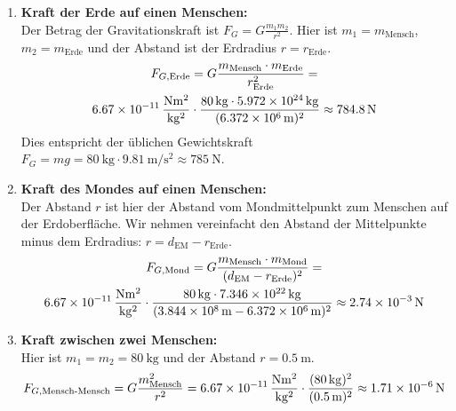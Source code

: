 \documentclass[ngerman]{scrreprt}
\newenvironment{loesungbox}[1]
  {\needspace{5\baselineskip}\begin{loesungboxstyle}[frametitle={#1}]}
  {\end{loesungboxstyle}}
\begin{document}
\begin{loesungbox}{Lösung zu \Cref{aufg:gravitation}}
\begin{enumerate}
    \item \textbf{Kraft der Erde auf einen Menschen:} \\
    Der Betrag der Gravitationskraft ist $F_G = G \frac{m_1 m_2}{r^2}$. Hier ist $m_1 = m_{\text{Mensch}}$, $m_2 = m_{\text{Erde}}$ und der Abstand ist der Erdradius $r = r_{\text{Erde}}$.
    \begin{multline}
        F_{G, \text{Erde}} = G \frac{m_{\text{Mensch}} \cdot m_{\text{Erde}}}{r_{\text{Erde}}^2} = \\
        \SI{6.67e-11}{\frac{\newton\meter^2}{\kilo\gram^2}} \cdot \frac{\SI{80}{\kilo\gram} \cdot \SI{5.972e24}{\kilo\gram}}{(\SI{6.372e6}{\meter})^2} \approx \SI{784.8}{\newton}
    \end{multline}
    Dies entspricht der üblichen Gewichtskraft $F_G = mg = \SI{80}{\kilo\gram} \cdot \SI{9.81}{\meter\per\second\squared} \approx \SI{785}{\newton}$.
    
    \item \textbf{Kraft des Mondes auf einen Menschen:} \\
    Der Abstand $r$ ist hier der Abstand vom Mondmittelpunkt zum Menschen auf der Erdoberfläche. Wir nehmen vereinfacht den Abstand der Mittelpunkte minus dem Erdradius: $r = d_{\text{EM}} - r_{\text{Erde}}$. 
    \begin{multline}
        F_{G, \text{Mond}} = G \frac{m_{\text{Mensch}} \cdot m_{\text{Mond}}}{(d_{\text{EM}} - r_{\text{Erde}})^2} = \\
        \SI{6.67e-11}{\frac{\newton\meter^2}{\kilo\gram^2}} \cdot \frac{\SI{80}{\kilo\gram} \cdot \SI{7.346e22}{\kilo\gram}}{(\SI{3.844e8}{\meter} - \SI{6.372e6}{\meter})^2} \approx \SI{2.74e-3}{\newton}
    \end{multline}
    
    \item \textbf{Kraft zwischen zwei Menschen:} \\
    Hier ist $m_1 = m_2 = \SI{80}{\kilo\gram}$ und der Abstand $r=\SI{0.5}{\meter}$.
    \begin{equation}
        F_{G, \text{Mensch-Mensch}} = G \frac{m_{\text{Mensch}}^2}{r^2} = \SI{6.67e-11}{\frac{\newton\meter^2}{\kilo\gram^2}} \cdot \frac{(\SI{80}{\kilo\gram})^2}{(\SI{0.5}{\meter})^2} \approx \SI{1.71e-6}{\newton}
    \end{equation}
    

\end{enumerate}
\end{loesungbox}
\end{document}
